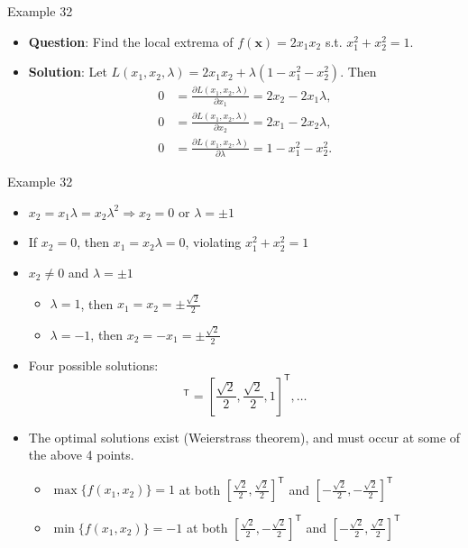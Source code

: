 \documentclass[aspectratio=169,hyperref,UTF8,CJK]{beamer}
\newcommand{\trans}{\mathsf{T}}
\newcommand{\vect}[1]{\boldsymbol{#1}}
\begin{document}
\begin{frame}{Example 32}
  \small
  \begin{itemize}
    \item \textbf{Question}: Find the local extrema of $f(\vect{x})=2x_1x_2$ s.t. $x_1^2+x_2^2=1$.
    \item \textbf{Solution}: Let $L(x_1,x_2,\lambda)=2x_1x_2+\lambda(1-x_1^2-x_2^2)$. Then
      \begin{align*}
        0&=\frac{\partial L(x_1,x_2,\lambda)}{\partial x_1}=2x_2-2x_1\lambda,\\
        0&=\frac{\partial L(x_1,x_2,\lambda)}{\partial x_2}=2x_1-2x_2\lambda,\\
        0&=\frac{\partial L(x_1,x_2,\lambda)}{\partial\lambda}=1-x_1^2-x_2^2.
      \end{align*}
  \end{itemize}
\end{frame}

\begin{frame}{Example 32}
  \scriptsize
  \begin{itemize}
    \item $x_2=x_1\lambda=x_2\lambda^2\Longrightarrow x_2=0$ or $\lambda=\pm1$
    \item If $x_2=0$, then $x_1=x_2\lambda=0$, violating $x_1^2+x_2^2=1$
    \item $x_2\ne0$ and $\lambda=\pm1$
      \begin{itemize}
        \item $\lambda=1$, then $x_1=x_2=\pm\frac{\sqrt2}{2}$
        \item $\lambda=-1$, then $x_2=-x_1=\pm\frac{\sqrt2}{2}$
      \end{itemize}
    \item Four possible solutions:
      \begin{equation*}
        [x_1,x_2,\lambda]^{\trans}=\left[\frac{\sqrt2}{2},\frac{\sqrt2}{2},1\right]^{\trans},\ldots
      \end{equation*}
    \item The optimal solutions exist (Weierstrass theorem), and must occur at some of the above 4 points.
      \begin{itemize}
        \item $\max\{f(x_1,x_2)\}=1$ at both
          $[\frac{\sqrt2}{2},\frac{\sqrt2}{2}]^{\trans}$ and
          $[-\frac{\sqrt2}{2},-\frac{\sqrt2}{2}]^{\trans}$
        \item $\min\{f(x_1,x_2)\}=-1$ at both
          $[\frac{\sqrt2}{2},-\frac{\sqrt2}{2}]^{\trans}$ and
          $[-\frac{\sqrt2}{2},\frac{\sqrt2}{2}]^{\trans}$
      \end{itemize}
  \end{itemize}
\end{frame}
\end{document}
